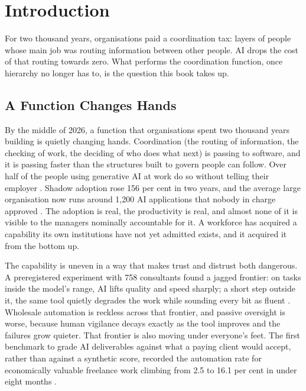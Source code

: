\chapter{Introduction}
\label{ch:introduction}

\epigraph{For two thousand years, organisations paid a coordination tax: layers of people whose main job was routing information between other people. AI drops the cost of that routing towards zero. What performs the coordination function, once hierarchy no longer has to, is the question this book takes up.}{}

\section{A Function Changes Hands}

By the middle of 2026, a function that organisations spent two thousand years building is quietly changing hands. Coordination (the routing of information, the checking of work, the deciding of who does what next) is passing to software, and it is passing faster than the structures built to govern people can follow. Over half of the people using generative AI at work do so without telling their employer \parencite{Mollick2023SecretCyborgs}. Shadow adoption rose 156 per cent in two years, and the average large organisation now runs around 1,200 AI applications that nobody in charge approved \parencite{IBM2025}. The adoption is real, the productivity is real, and almost none of it is visible to the managers nominally accountable for it. A workforce has acquired a capability its own institutions have not yet admitted exists, and it acquired it from the bottom up.

The capability is uneven in a way that makes trust and distrust both dangerous. A preregistered experiment with 758 consultants found a jagged frontier: on tasks inside the model's range, AI lifts quality and speed sharply; a short step outside it, the same tool quietly degrades the work while sounding every bit as fluent \parencite{DellAcqua2026}. Wholesale automation is reckless across that frontier, and passive oversight is worse, because human vigilance decays exactly as the tool improves and the failures grow quieter. That frontier is also moving under everyone's feet. The first benchmark to grade AI deliverables against what a paying client would accept, rather than against a synthetic score, recorded the automation rate for economically valuable freelance work climbing from 2.5 to 16.1 per cent in under eight months \parencite{CAIS2026RLI}.


